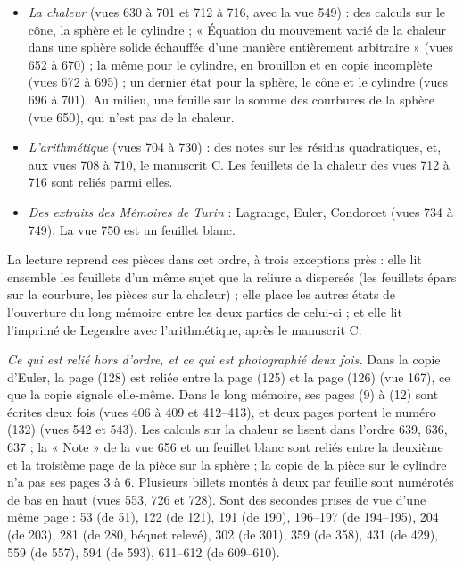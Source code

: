 \documentclass[11pt,a4paper]{article}
\begin{document}
\begin{itemize}
sorte que les vues 598 et 614 à 618 forment un seul état, selon toute apparence le
plus ancien, et non l'ouverture d'un autre mémoire ; reliée entre les deux, une
seconde rédaction de la comparaison des sons, pages (61) à (72) (vues 600 à 613) ;
enfin quatre pages sur des surfaces cylindriques, qui renvoient au « N.o 11 de mon
memoire pour 1813 » (vues 620 à 626).
\item \emph{La chaleur} (vues 630 à 701 et 712 à 716, avec la vue 549) : des
calculs sur le cône, la sphère et le cylindre ; « Équation du mouvement varié de
la chaleur dans une sphère solide échauffée d'une manière entièrement
arbitraire » (vues 652 à 670) ; la même pour le cylindre, en brouillon et en copie
incomplète (vues 672 à 695) ; un dernier état pour la sphère, le cône et le
cylindre (vues 696 à 701). Au milieu, une feuille sur la somme des courbures de la
sphère (vue 650), qui n'est pas de la chaleur.
\item \emph{L'arithmétique} (vues 704 à 730) : des notes sur les résidus
quadratiques, et, aux vues 708 à 710, le manuscrit C. Les feuillets de la chaleur
des vues 712 à 716 sont reliés parmi elles.
\item \emph{Des extraits des Mémoires de Turin} : Lagrange, Euler, Condorcet (vues
734 à 749). La vue 750 est un feuillet blanc.
\end{itemize}

La lecture reprend ces pièces dans cet ordre, à trois exceptions près : elle lit
ensemble les feuillets d'un même sujet que la reliure a dispersés (les feuillets
épars sur la courbure, les pièces sur la chaleur) ; elle place les autres états
de l'ouverture du long mémoire entre les deux parties de celui-ci ; et elle lit
l'imprimé de Legendre avec l'arithmétique, après le manuscrit C.

\emph{Ce qui est relié hors d'ordre, et ce qui est photographié deux fois.} Dans la
copie d'Euler, la page (128) est reliée entre la page (125) et la page (126) (vue
167), ce que la copie signale elle-même. Dans le long mémoire, ses pages (9) à
(12) sont écrites deux fois (vues 406 à 409 et 412--413), et deux pages portent le
numéro (132) (vues 542 et 543). Les calculs sur la chaleur se lisent dans l'ordre
639, 636, 637 ; la « Note » de la vue 656 et un feuillet blanc sont reliés entre la
deuxième et la troisième page de la pièce sur la sphère ; la copie de la pièce sur
le cylindre n'a pas ses pages 3 à 6. Plusieurs billets montés à deux par feuille
sont numérotés de bas en haut (vues 553, 726 et 728). Sont des secondes prises de
vue d'une même page : 53 (de 51), 122 (de 121), 191 (de 190), 196--197 (de
194--195), 204 (de 203), 281 (de 280, béquet relevé), 302 (de 301), 359 (de 358),
431 (de 429), 559 (de 557), 594 (de 593), 611--612 (de 609--610).
\end{document}
